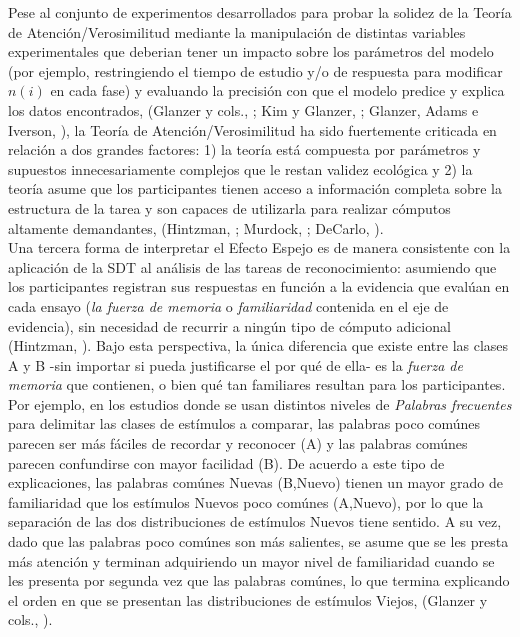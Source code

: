 Pese al conjunto de experimentos desarrollados para probar la solidez de la Teoría de Atención/Verosimilitud mediante la manipulación de distintas variables experimentales que deberian tener un impacto sobre los parámetros del modelo (por ejemplo, restringiendo el tiempo de estudio y/o de respuesta para modificar $n(i)$ en cada fase) y evaluando la precisión con que el modelo predice y explica los datos encontrados, (Glanzer y cols., \citeyear{Glanzer1993}; Kim y Glanzer, \citeyear{Kim1993}; Glanzer, Adams e Iverson, \citeyear{Glanzer1991}), la Teoría de Atención/Verosimilitud ha sido fuertemente criticada en relación a dos grandes factores: 1) la teoría está compuesta por parámetros y supuestos innecesariamente complejos que le restan validez ecológica y 2) la teoría asume que los participantes tienen acceso a información completa sobre la estructura de la tarea y son capaces de utilizarla para realizar cómputos altamente demandantes, (Hintzman, \citeyear{Hintzman1994}; Murdock, \citeyear{Murdock1998}; DeCarlo, \citeyear{DeCarlo2007}).\\

Una tercera forma de interpretar el Efecto Espejo es de manera consistente con la aplicación de la SDT al análisis de las tareas de reconocimiento: asumiendo que los participantes registran sus respuestas en función a la evidencia que evalúan en cada ensayo (\textit{la fuerza de memoria} o \textit{familiaridad} contenida en el eje de evidencia), sin necesidad de recurrir a ningún tipo de cómputo adicional (Hintzman, \citeyear{Hintzman1994}). Bajo esta perspectiva, la única diferencia que existe entre las clases A y B -sin importar si pueda justificarse el por qué de ella- es la \textit{fuerza de memoria} que contienen, o bien qué tan familiares resultan para los participantes. Por ejemplo, en los estudios donde se usan distintos niveles de \textit{Palabras frecuentes} para delimitar las clases de estímulos a comparar, las palabras poco comúnes parecen ser más fáciles de recordar y reconocer (A) y las palabras comúnes parecen confundirse con mayor facilidad (B). De acuerdo a este tipo de explicaciones, las palabras comúnes Nuevas (B,Nuevo) tienen un mayor grado de familiaridad que los estímulos Nuevos poco comúnes (A,Nuevo), por lo que la separación de las dos distribuciones de estímulos Nuevos tiene sentido. A su vez, dado que las palabras poco comúnes son más salientes, se asume que se les presta más atención y terminan adquiriendo un mayor nivel de familiaridad cuando se les presenta por segunda vez que las palabras comúnes, lo que termina explicando el orden en que se presentan las distribuciones de estímulos Viejos, (Glanzer y cols., \citeyear{Glanzer1993}).\\

